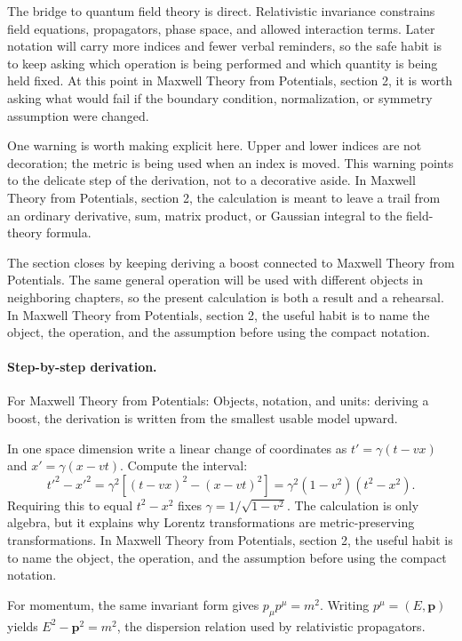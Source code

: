 The bridge to quantum field theory is direct.  Relativistic invariance constrains field equations, propagators, phase space, and allowed interaction terms.  Later notation will carry more indices and fewer verbal reminders, so the safe habit is to keep asking which operation is being performed and which quantity is being held fixed.  At this point in Maxwell Theory from Potentials, section 2, it is worth asking what would fail if the boundary condition, normalization, or symmetry assumption were changed.

One warning is worth making explicit here.  Upper and lower indices are not decoration; the metric is being used when an index is moved.  This warning points to the delicate step of the derivation, not to a decorative aside.  In Maxwell Theory from Potentials, section 2, the calculation is meant to leave a trail from an ordinary derivative, sum, matrix product, or Gaussian integral to the field-theory formula.

The section closes by keeping deriving a boost connected to Maxwell Theory from Potentials.  The same general operation will be used with different objects in neighboring chapters, so the present calculation is both a result and a rehearsal.  In Maxwell Theory from Potentials, section 2, the useful habit is to name the object, the operation, and the assumption before using the compact notation.



\paragraph{Step-by-step derivation.}

For Maxwell Theory from Potentials: Objects, notation, and units: deriving a boost, the derivation is written from the smallest usable model upward.

In one space dimension write a linear change of coordinates as \(t'=\gamma(t-vx)\) and \(x'=\gamma(x-vt)\).  Compute the interval:
\[
  t'^2-x'^2
  =
  \gamma^2[(t-vx)^2-(x-vt)^2]
  =
  \gamma^2(1-v^2)(t^2-x^2).
\]
Requiring this to equal \(t^2-x^2\) fixes \(\gamma=1/\sqrt{1-v^2}\).  The calculation is only algebra, but it explains why Lorentz transformations are metric-preserving transformations.  In Maxwell Theory from Potentials, section 2, the useful habit is to name the object, the operation, and the assumption before using the compact notation.

For momentum, the same invariant form gives \(p_\mu p^\mu=m^2\).  Writing \(p^\mu=(E,\bm p)\) yields \(E^2-\bm p^2=m^2\), the dispersion relation used by relativistic propagators.

